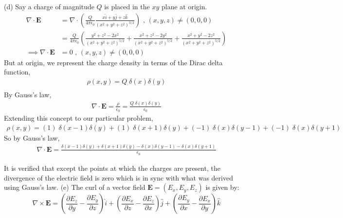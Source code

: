 \documentclass[12pt]{article}
\providecommand{\brak}[1]{\ensuremath{\left(#1\right)}}
\begin{document}
(d) Say a charge of magnitude $Q$ is placed in the $xy$ plane at origin.
\begin{align*}
    \nabla \cdot \mathbf{E} &= \nabla \cdot \brak{\frac{Q}{4\pi\epsilon_0} \frac{x\hat{i} + y\hat{j} + z\hat{k}}{\brak{x^2 + y^2 + z^2}^{3/2}}} \text{ , } \brak{x, y, z} \neq \brak{0, 0, 0}\\
    &= \frac{Q}{4\pi\epsilon_0} \brak{\frac{y^2 + z^2 - 2x^2}{\brak{x^2 + y^2 + z^2}^{5/2}} + \frac{x^2 + z^2 - 2y^2}{\brak{x^2 + y^2 + z^2}^{5/2}} + \frac{x^2 + y^2 - 2z^2}{\brak{x^2 + y^2 + z^2}^{5/2}}}\\
    \implies \nabla \cdot \mathbf{E} &= 0 \text{ , } \brak{x, y, z} \neq \brak{0, 0, 0}
\end{align*}
But at origin, we represent the charge density in terms of the Dirac delta function,
\begin{align*}
    \rho\brak{x, y} = Q\;\delta\brak{x}\delta\brak{y}\\
\end{align*}
By Gauss's law,
\begin{align*}
    \nabla \cdot \mathbf{E} = \frac{\rho}{\epsilon_0} = \frac{Q\;\delta\brak{x}\delta\brak{y}}{\epsilon_0}
\end{align*}
Extending this concept to our particular problem,
\begin{align*}
    \rho\brak{x, y} = \brak{1} \; \delta\brak{x - 1}\delta\brak{y} + \brak{1} \; \delta\brak{x + 1}\delta\brak{y} + \brak{-1} \; \delta\brak{x}\delta\brak{y - 1} + \brak{-1} \; \delta\brak{x}\delta\brak{y + 1}
\end{align*}
So by Gauss's law,
\begin{align*}
    \nabla \cdot \mathbf{E} = \frac{\delta\brak{x - 1}\delta\brak{y} + \delta\brak{x + 1}\delta\brak{y} - \delta\brak{x}\delta\brak{y - 1} - \delta\brak{x}\delta\brak{y + 1}}{\epsilon_0}
\end{align*}

It is verified that except the points at which the charges are present, the divergence of the electric field is zero which is in sync with what was derived using Gauss's law.
\newline
\newline
(e)
The curl of a vector field $\mathbf{E} = (E_x, E_y, E_z)$ is given by:
\begin{equation}
    \nabla \times \mathbf{E} = 
    \brak{\frac{\partial E_z}{\partial y} - \frac{\partial E_y}{\partial z}} \hat{i} + \brak{\frac{\partial E_x}{\partial z} - \frac{\partial E_z}{\partial x}} \hat{j} + \brak{\frac{\partial E_y}{\partial x} - \frac{\partial E_x}{\partial y}} \hat{k}
\end{equation}
\end{document}

